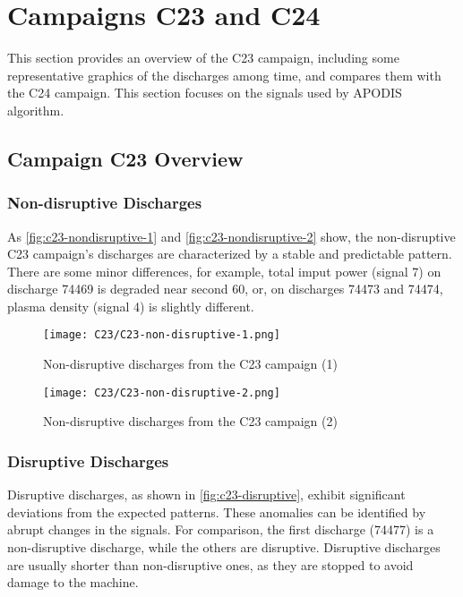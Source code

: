 \chapter{Campaigns C23 and C24}\label{apx:campaigns}

This section provides an overview of the C23 campaign, including some representative graphics of the discharges among time, and compares them with the C24 campaign. This section focuses on the signals used by \ac{APODIS} algorithm.

\section{Campaign C23 Overview}

\subsection{Non-disruptive Discharges}

As \autoref{fig:c23-nondisruptive-1} and \autoref{fig:c23-nondisruptive-2} show, the non-disruptive C23 campaign's discharges are characterized by a stable and predictable pattern. There are some minor differences, for example, total imput power (signal 7) on discharge 74469 is degraded near second 60, or, on discharges 74473 and 74474, plasma density (signal 4) is slightly different.

\begin{figure}[H]
    \centering
    \texttt{[image: C23/C23-non-disruptive-1.png]}
    \caption{Non-disruptive discharges from the C23 campaign (1)}
    \label{fig:c23-nondisruptive-1}    
\end{figure}

\begin{figure}[H]
    \centering
    \texttt{[image: C23/C23-non-disruptive-2.png]}
    \caption{Non-disruptive discharges from the C23 campaign (2)}
    \label{fig:c23-nondisruptive-2}    
\end{figure}

\subsection{Disruptive Discharges}

Disruptive discharges, as shown in \autoref{fig:c23-disruptive}, exhibit significant deviations from the expected patterns. These anomalies can be identified by abrupt changes in the signals. For comparison, the first discharge (74477) is a non-disruptive discharge, while the others are disruptive. Disruptive discharges are usually shorter than non-disruptive ones, as they are stopped to avoid damage to the machine. 

